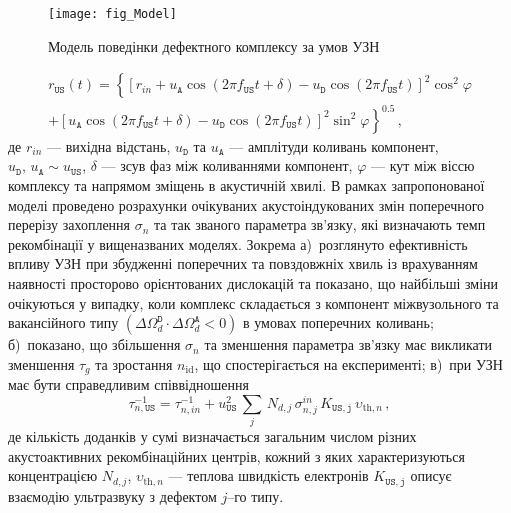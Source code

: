 \begin{figure}[b]
\center
\texttt{[image: fig\_Model]}
\caption{\label{fig_Model}
Модель поведінки дефектного комплексу за умов УЗН
}%
\end{figure}


\begin{multline}
\label{eqrUS}
r_\mathtt{US}(t)=\left\{[r_{in}+u_\mathtt{A}\cos(2\pi f_\mathtt{US}t+\delta)-u_\mathtt{D}\cos(2\pi f_\mathtt{US}t)]^2\cos^2\varphi \right.\\
    \left.+ [u_\mathtt{A}\cos(2\pi f_\mathtt{US}t+\delta)-u_\mathtt{D}\cos(2\pi f_\mathtt{US}t)]^2\sin^2\varphi\right\}^{0.5}\,,
\end{multline}
де
$r_{in}$ --- вихідна відстань,
$u_\mathtt{D}$ та $u_\mathtt{A}$ --- амплітуди коливань компонент, $u_\mathtt{D},\,u_\mathtt{A}\sim u_\mathtt{US}$,
$\delta$ --- зсув фаз між коливаннями компонент,
$\varphi$ --- кут між віссю комплексу та напрямом зміщень в акустичній хвилі.
В рамках запропонованої моделі проведено розрахунки очікуваних акустоіндукованих змін поперечного перерізу захоплення $\sigma_{n}$ та так званого параметра зв'язку,
які визначають темп рекомбінації у вищеназваних моделях.
Зокрема
а)~розглянуто ефективність впливу УЗН при збудженні поперечних та повздовжніх хвиль із врахуванням наявності просторово орієнтованих дислокацій та показано, що найбільші зміни очікуються у випадку, коли комплекс складається з компонент міжвузольного та вакансійного типу $(\Delta\Omega_d^\mathtt{D}\cdot\Delta\Omega_d^\mathtt{A}<0)$
 в умовах поперечних коливань;
б)~показано, що збільшення $\sigma_{n}$ та зменшення параметра зв'язку має викликати зменшення $\tau_g$ та зростання $n_\mathrm{id}$, що спостерігається на експерименті;
в)~при УЗН має бути справедливим співвідношення
\begin{equation}
\label{eqEpsSigUSA}
\tau_{n,\mathtt{US}}^{-1}=
\tau_{n,in}^{-1}+u_{\mathtt{US}}^2\,\sum_j\,N_{d,j}\,\sigma_{n,j}^{in}\,K_\mathtt{US,j}\,\upsilon_{\mathrm{th},n}\,,
\end{equation}
де
кількість доданків у сумі визначається загальним числом різних акустоактивних рекомбінаційних центрів,
кожний з яких характеризуються концентрацією $N_{d,j}$,
$\upsilon_{\mathrm{th},n}$ --- теплова швидкість електронів
$K_\mathtt{US,j}$ описує взаємодію ультразвуку з дефектом $j$--го типу.




